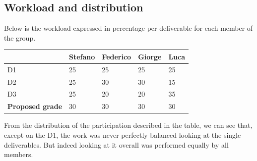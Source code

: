 \subsection{Workload and distribution}

Below is the workload expressed in percentage per deliverable for each member of the group.

\begin{table}[H]
\centering
\begin{tabular}{|p{3cm}|p{2cm}|p{2cm}|p{2cm}|p{2cm}|}
\hline
\rowcolor{gray!50}
 & \textbf{Stefano} & \textbf{Federico} & \textbf{Giorge} & \textbf{Luca} \\
\hline
D1 & 25 & 25 & 25 & 25 \\
\hline
D2 & 25 & 30 & 30 & 15 \\
\hline
D3 & 25 & 20 & 20 & 35 \\
\hline
\rowcolor{red!20}
\textbf{Proposed grade} & 30 & 30 & 30 & 30 \\
\hline
\end{tabular}
\end{table}

From the distribution of the participation described in the table, we can see that, except on the D1, the work was never perfectly balanced looking at the single deliverables. But indeed looking at it overall was performed equally by all members.

